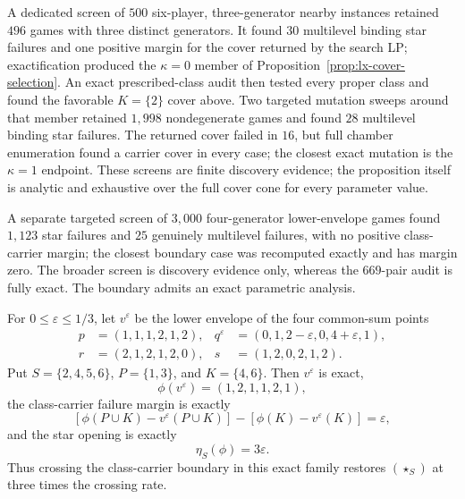 A dedicated screen of $500$ six-player, three-generator nearby instances
retained $496$ games with three distinct generators.  It found $30$
multilevel binding star failures and one positive margin for the cover
returned by the search LP; exactification produced the $\kappa=0$ member of
Proposition~\ref{prop:lx-cover-selection}.  An exact prescribed-class audit
then tested every proper class and found the favorable $K=\{2\}$ cover above.
Two targeted mutation sweeps around that member retained $1{,}998$
nondegenerate games and found $28$ multilevel binding star failures.  The
returned cover failed in $16$, but full chamber enumeration found a carrier
cover in every case; the closest exact mutation is the $\kappa=1$ endpoint.
These screens are finite discovery evidence; the proposition itself is
analytic and exhaustive over the full cover cone for every parameter value.

A separate targeted screen of $3{,}000$ four-generator
lower-envelope games found $1{,}123$ star failures and $25$ genuinely
multilevel failures, with no positive class-carrier margin; the closest
boundary case was recomputed exactly and has margin zero.  The broader screen
is discovery evidence only, whereas the $669$-pair audit is fully exact.
The boundary admits an exact parametric analysis.

\begin{proposition}
\label{prop:lx-class-boundary}
For $0\leq\varepsilon\leq1/3$, let $v^\varepsilon$ be the lower envelope of
the four common-sum points
\[
\begin{aligned}
 p&=(1,1,1,2,1,2),&
 q^\varepsilon&=(0,1,2-\varepsilon,0,4+\varepsilon,1),\\
 r&=(2,1,2,1,2,0),&
 s&=(1,2,0,2,1,2).
\end{aligned}
\]
Put $S=\{2,4,5,6\}$, $P=\{1,3\}$, and $K=\{4,6\}$.  Then
$v^\varepsilon$ is exact,
\[
 \phi(v^\varepsilon)=(1,2,1,1,2,1),
\]
the class-carrier failure margin is exactly
\[
 [\phi(P\cup K)-v^\varepsilon(P\cup K)]
 -[\phi(K)-v^\varepsilon(K)]=\varepsilon,
\]
and the star opening is exactly
\[
 \eta_S(\phi)=3\varepsilon.
\]
Thus crossing the class-carrier boundary in this exact family restores
$(\star_S)$ at three times the crossing rate.
\end{proposition}

